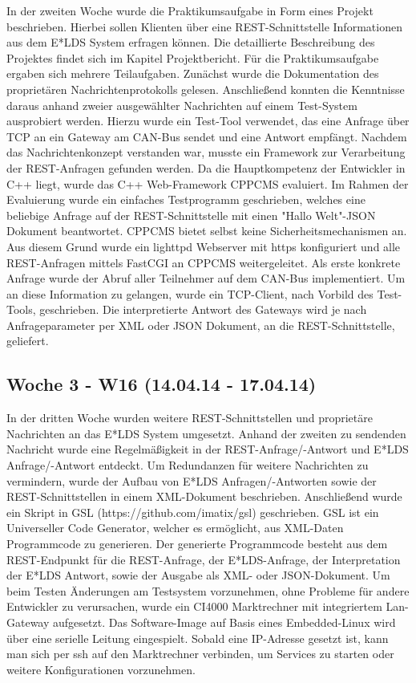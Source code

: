 \documentclass{article}
\begin{document}
In der zweiten Woche wurde die Praktikumsaufgabe in Form eines Projekt beschrieben. Hierbei sollen Klienten über eine REST-Schnittstelle Informationen aus dem E*LDS System erfragen können. Die detaillierte Beschreibung des Projektes findet sich im Kapitel Projektbericht.
Für die Praktikumsaufgabe ergaben sich mehrere Teilaufgaben. Zunächst wurde die Dokumentation des proprietären Nachrichtenprotokolls gelesen. Anschließend konnten die Kenntnisse daraus anhand zweier ausgewählter Nachrichten auf einem Test-System ausprobiert werden. Hierzu wurde ein Test-Tool verwendet, das eine Anfrage über TCP an ein Gateway am CAN-Bus sendet und eine Antwort empfängt. Nachdem das Nachrichtenkonzept verstanden war, musste ein Framework zur Verarbeitung der REST-Anfragen gefunden werden. Da die Hauptkompetenz der Entwickler in C++ liegt, wurde das C++ Web-Framework CPPCMS evaluiert. Im Rahmen der Evaluierung wurde ein einfaches Testprogramm geschrieben, welches eine beliebige Anfrage auf der REST-Schnittstelle mit einen "Hallo Welt"-JSON Dokument beantwortet. CPPCMS bietet selbst keine Sicherheitsmechanismen an. Aus diesem Grund wurde ein lighttpd Webserver mit https konfiguriert und alle REST-Anfragen mittels FastCGI an CPPCMS weitergeleitet. Als erste konkrete Anfrage wurde der Abruf aller Teilnehmer auf dem CAN-Bus implementiert. Um an diese Information zu gelangen, wurde ein TCP-Client, nach Vorbild des Test-Tools, geschrieben. Die interpretierte Antwort des Gateways wird je nach Anfrageparameter per XML oder JSON Dokument, an die REST-Schnittstelle, geliefert.

\subsection{Woche 3 - W16 (14.04.14 - 17.04.14)}

In der dritten Woche wurden weitere REST-Schnittstellen und proprietäre Nachrichten an das E*LDS System umgesetzt. Anhand der zweiten zu sendenden Nachricht wurde eine Regelmäßigkeit in der REST-Anfrage/-Antwort und E*LDS Anfrage/-Antwort entdeckt. Um Redundanzen für weitere Nachrichten zu vermindern, wurde der Aufbau von E*LDS Anfragen/-Antworten sowie der REST-Schnittstellen in einem XML-Dokument beschrieben. Anschließend wurde ein Skript in GSL (https://github.com/imatix/gsl) geschrieben. GSL ist ein Universeller Code Generator, welcher es ermöglicht, aus XML-Daten Programmcode zu generieren. Der generierte Programmcode besteht aus dem REST-Endpunkt für die REST-Anfrage, der E*LDS-Anfrage, der Interpretation der E*LDS Antwort, sowie der Ausgabe als XML- oder JSON-Dokument. Um beim Testen Änderungen am Testsystem vorzunehmen, ohne Probleme für andere Entwickler zu verursachen, wurde ein CI4000 Marktrechner mit integriertem Lan-Gateway aufgesetzt. Das Software-Image auf Basis eines Embedded-Linux wird über eine serielle Leitung eingespielt. Sobald eine IP-Adresse gesetzt ist, kann man sich per ssh auf den Marktrechner verbinden, um Services zu starten oder weitere Konfigurationen vorzunehmen.
\end{document}
